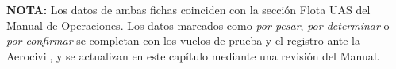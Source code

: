 \textbf{NOTA:} Los datos de ambas fichas coinciden con la sección Flota UAS del Manual de Operaciones. Los datos marcados como \textit{por pesar}, \textit{por determinar} o \textit{por confirmar} se completan con los vuelos de prueba y el registro ante la Aerocivil, y se actualizan en este capítulo mediante una revisión del Manual.
